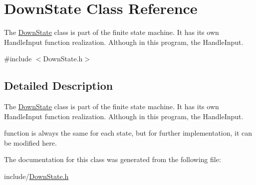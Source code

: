 \hypertarget{class_down_state}{}\section{Down\+State Class Reference}
\label{class_down_state}


The \mbox{\hyperlink{class_down_state}{Down\+State}} class is part of the finite state machine. It has its own Handle\+Input function realization. Although in this program, the Handle\+Input.  




{\ttfamily \#include $<$Down\+State.\+h$>$}



\subsection{Detailed Description}
The \mbox{\hyperlink{class_down_state}{Down\+State}} class is part of the finite state machine. It has its own Handle\+Input function realization. Although in this program, the Handle\+Input. 

function is always the same for each state, but for further implementation, it can be modified here. 

The documentation for this class was generated from the following file\+:\begin{DoxyCompactItemize}
\item 
include/\mbox{\hyperlink{_down_state_8h}{Down\+State.\+h}}\end{DoxyCompactItemize}
